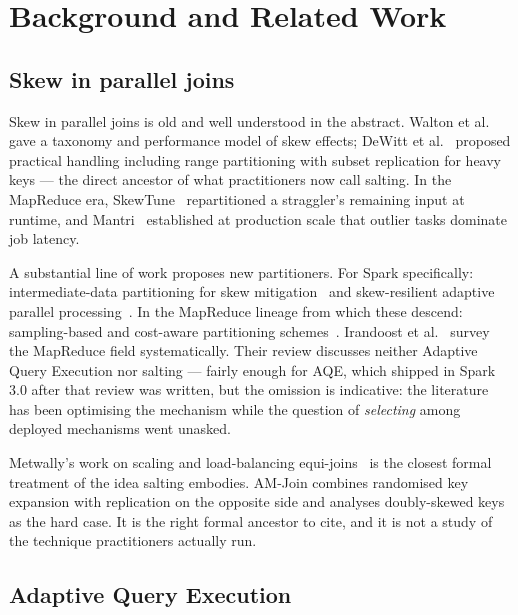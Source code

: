 \section{Background and Related Work}
\label{sec:background}

\subsection{Skew in parallel joins}

Skew in parallel joins is old and well understood in the abstract. Walton et
al.~\cite{walton1991taxonomy} gave a taxonomy and performance model of skew
effects; DeWitt et al.~\cite{dewitt1992skew} proposed practical handling
including range partitioning with subset replication for heavy keys --- the
direct ancestor of what practitioners now call salting. In the MapReduce era,
SkewTune~\cite{kwon2012skewtune, kwon2012skewtunedemo} repartitioned a
straggler's remaining input at runtime, and Mantri~\cite{ananthanarayanan2010mantri}
established at production scale that outlier tasks dominate job latency.

A substantial line of work proposes new partitioners. For Spark specifically:
intermediate-data partitioning for skew mitigation~\cite{tang2021intermediate}
and skew-resilient adaptive parallel processing~\cite{shen2020srspark}. In the
MapReduce lineage from which these descend: sampling-based and cost-aware
partitioning schemes~\cite{myung2016handling, gufler2011skew}. Irandoost et
al.~\cite{irandoost2019skewslr} survey the MapReduce field systematically.
Their review discusses neither Adaptive Query Execution nor salting --- fairly
enough for AQE, which shipped in Spark 3.0 after that review was written, but
the omission is indicative: the literature has been optimising the mechanism
while the question of \emph{selecting} among deployed mechanisms went unasked.

Metwally's work on scaling and load-balancing equi-joins~\cite{metwally2025amjoin}
is the closest formal treatment of the idea salting embodies. AM-Join combines
randomised key expansion with replication on the opposite side and analyses
doubly-skewed keys as the hard case. It is the right formal ancestor to cite,
and it is not a study of the technique practitioners actually run.

\subsection{Adaptive Query Execution}

